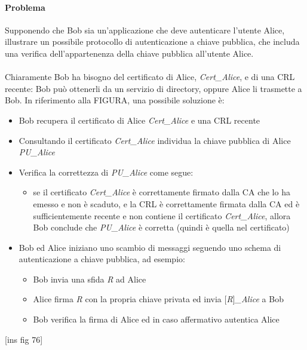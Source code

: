\paragraph{Problema}
Supponendo che Bob sia un'applicazione che deve autenticare l'utente Alice, illustrare un possibile protocollo di
autenticazione a chiave pubblica, che includa una verifica dell'appartenenza della chiave pubblica all'utente Alice.
\\ \\
Chiaramente Bob ha bisogno del certificato di Alice, \textit{Cert_{Alice}}, e di una CRL recente: Bob può ottenerli da un servizio di directory, oppure Alice li trasmette a Bob. 
In riferimento alla FIGURA, una possibile soluzione è:
\begin{itemize}
\item Bob recupera il certificato di Alice \textit{Cert_{Alice}} e una CRL recente
\item Consultando il certificato \textit{Cert_{Alice}} individua la chiave pubblica di Alice \textit{PU_{Alice}}
\item Verifica la correttezza di \textit{PU_{Alice}} come segue:
\begin{itemize}
\item se il certificato \textit{Cert_{Alice}} è correttamente firmato dalla CA che lo ha emesso e non è scaduto, e
la CRL è correttamente firmata dalla CA ed è sufficientemente recente e non contiene il certificato \textit{Cert_{Alice}}, allora Bob conclude che \textit{PU_{Alice}} è corretta (quindi è quella nel certificato)
\end{itemize}
\item Bob ed Alice iniziano uno scambio di messaggi seguendo uno schema di autenticazione a chiave pubblica, ad esempio:
\begin{itemize}
\item Bob invia una sfida \textit{R} ad Alice
\item Alice firma \textit{R} con la propria chiave privata ed invia [\textit{R}]\textit{_{Alice}} a Bob
\item Bob verifica la firma di Alice ed in caso affermativo autentica Alice
\end{itemize}
\end{itemize}
[ins fig 76]

